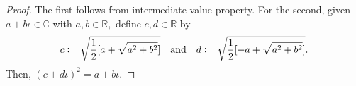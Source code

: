\FTAprelim*\label{lem:FTAprelim2}
\begin{flushright}\hyperref[lem:FTAprelim]{\upsym}\end{flushright}
\begin{proof} 
    The first follows from intermediate value property. For the second, given $a + b \iota \in \mathbb{C}$ with $a, b \in \mathbb{R},$ define $c, d \in \mathbb{R}$ by
    \begin{equation*} 
        c \vcentcolon= \sqrt{\frac{1}{2}[a + \sqrt{a^2 + b^2}]} \quad\text{and}\quad d \vcentcolon= \sqrt{\frac{1}{2}[-a + \sqrt{a^2 + b^2}]}.
    \end{equation*}
    Then, $(c + d \iota)^2 = a + b\iota.$
\end{proof}
\FTA*\label{thm:FTA2}
\begin{flushright}\hyperref[thm:FTA]{\upsym}\end{flushright}
